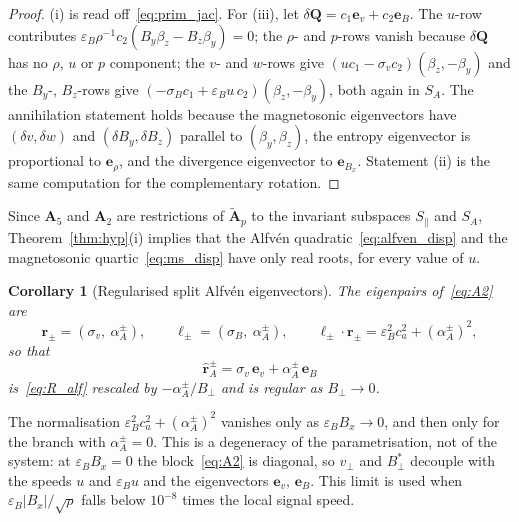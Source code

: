 \documentclass[a4paper,fleqn]{cas-sc}
\newtheorem{corollary}[theorem]{Corollary}
\theoremstyle{remark}
\newcommand{\eps}{\varepsilon}
\newcommand{\epsB}{\eps_{B}}
\begin{document}
\begin{proof}
(i) is read off~\eqref{eq:prim_jac}. For (iii), let $\delta\mathbf Q=c_1\mathbf e_v+c_2\mathbf e_B$. The $u$-row contributes $\epsB\rho^{-1}c_2(B_y\beta_z-B_z\beta_y)=0$; the $\rho$- and $p$-rows vanish because $\delta\mathbf Q$ has no $\rho$, $u$ or $p$ component; the $v$- and $w$-rows give
$(uc_1-\sigma_vc_2)(\beta_z,-\beta_y)$ and the $B_y$-, $B_z$-rows give
$(-\sigma_Bc_1+\epsB u\,c_2)(\beta_z,-\beta_y)$, both again in $S_A$. The
annihilation statement holds because the magnetosonic eigenvectors have
$(\delta v,\delta w)$ and $(\delta B_y,\delta B_z)$ parallel to
$(\beta_y,\beta_z)$, the entropy eigenvector is proportional to $\mathbf e_\rho$,
and the divergence eigenvector to $\mathbf e_{B_x}$. Statement (ii) is the same
computation for the complementary rotation.
\end{proof}

Since $\mathbf A_5$ and $\mathbf A_2$ are restrictions of $\tilde{\mathbf A}_p$ to
the invariant subspaces $S_\parallel$ and $S_A$, Theorem~\ref{thm:hyp}(i)
implies that the Alfv\'en quadratic~\eqref{eq:alfven_disp} and the
magnetosonic quartic~\eqref{eq:ms_disp} have only real roots, for every
value of $u$.

\begin{corollary}[Regularised split Alfv\'en eigenvectors]
\label{cor:alfven}
The eigenpairs of~\eqref{eq:A2} are
\[
\mathbf r_\pm=(\sigma_v,\ \alpha_A^{\pm}),\qquad
\boldsymbol\ell_\pm=(\sigma_B,\ \alpha_A^{\pm}),\qquad
\boldsymbol\ell_\pm\!\cdot\mathbf r_\pm=\epsB^{2}c_a^{2}+(\alpha_A^{\pm})^{2},
\]
so that
\begin{equation}
\label{eq:Ralf_reg}
\hat{\mathbf r}_A^{\pm}=\sigma_v\,\mathbf e_v+\alpha_A^{\pm}\,\mathbf e_B
\end{equation}
is~\eqref{eq:R_alf} rescaled by $-\alpha_A^{\pm}/B_\perp$ and is regular as
$B_\perp\to0$.
\end{corollary}

The normalisation $\epsB^{2}c_a^{2}+(\alpha_A^{\pm})^{2}$ vanishes only as
$\epsB B_x\to0$, and then only for the branch with $\alpha_A^{\pm}=0$. This is a
degeneracy of the parametrisation, not of the system: at $\epsB B_x=0$ the
block~\eqref{eq:A2} is diagonal, so $v_\perp$ and $B^{*}_\perp$ decouple with the
speeds $u$ and $\epsB u$ and the eigenvectors $\mathbf e_v$, $\mathbf e_B$. This
limit is used when $\epsB|B_x|/\sqrt\rho$ falls below $10^{-8}$ times the local
signal speed.
 

 
\end{document}
